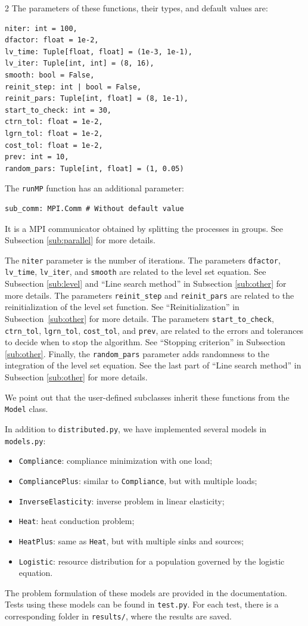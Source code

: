 \documentclass[a4paper, oneside]{article}
\newcommand{\code}[1]{\texttt{#1}}
\begin{document}
\begin{multicols}{2}
The parameters of these functions, their types, and default values are:
\begin{lstlisting}
niter: int = 100,
dfactor: float = 1e-2,
lv_time: Tuple[float, float] = (1e-3, 1e-1),
lv_iter: Tuple[int, int] = (8, 16),
smooth: bool = False,
reinit_step: int | bool = False,
reinit_pars: Tuple[int, float] = (8, 1e-1),
start_to_check: int = 30,
ctrn_tol: float = 1e-2,
lgrn_tol: float = 1e-2,
cost_tol: float = 1e-2,
prev: int = 10,
random_pars: Tuple[int, float] = (1, 0.05)
\end{lstlisting}
The \code{runMP} function has an additional parameter:
\begin{lstlisting}
sub_comm: MPI.Comm # Without default value
\end{lstlisting}
It is a MPI communicator obtained by splitting the processes in groups.
See Subsection \ref{sub:parallel} for more details.

The \code{niter} parameter is the number of iterations.
The parameters \code{dfactor}, \code{lv\_time}, \code{lv\_iter}, and \code{smooth}
are related to the level set equation.
See Subsection \ref{sub:level} and ``Line search method'' in Subsection \ref{sub:other} for more details.
The parameters \code{reinit\_step} and \code{reinit\_pars}
are related to the reinitialization of the level set function.
See ``Reinitialization'' in Subsection~\ref{sub:other} for more details.
The parameters \code{start\_to\_check}, \code{ctrn\_tol}, \code{lgrn\_tol}, \code{cost\_tol}, and \code{prev}, are related
to the errors and tolerances to decide when to stop the algorithm. See ``Stopping criterion'' in Subsection \ref{sub:other}.
Finally, the \code{random\_pars} parameter adds randomness to the integration of the level set equation.
See the last part of ``Line search method'' in Subsection \ref{sub:other} for more details.

We point out that the user-defined subclasses inherit these functions from the \code{Model} class.

In addition to \code{distributed.py}, we have implemented several models in \code{models.py}:
\begin{itemize}[left=0.0em]
\item \code{Compliance}: compliance minimization with one load;
\item \code{CompliancePlus}: similar to \code{Compliance}, but with multiple loads;
\item \code{InverseElasticity}: inverse problem in linear elasticity;
\item \code{Heat}: heat conduction problem;
\item \code{HeatPlus}: same as \code{Heat}, but with multiple sinks and sources;
\item \code{Logistic}: resource distribution for a population governed by the logistic equation.
\end{itemize}
The problem formulation of these models are provided in the documentation.
Tests using these models can be found in \code{test.py}.
For each test, there is a corresponding folder in \code{results/}, where the results are saved.


\end{multicols}
\end{document}

